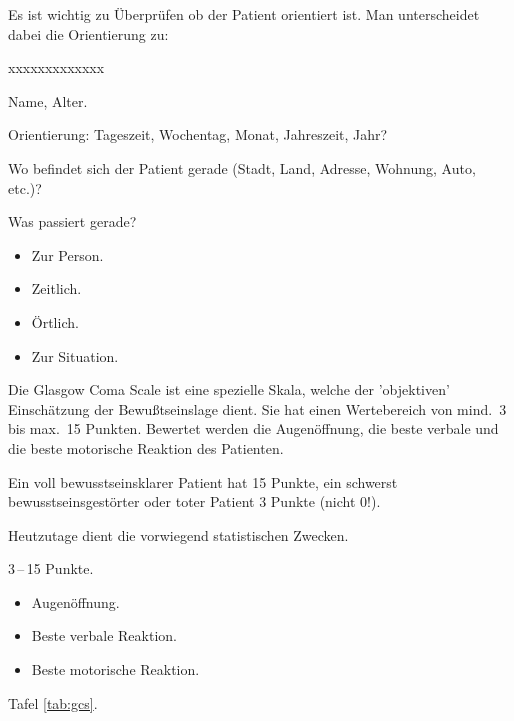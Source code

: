 {

Es ist wichtig zu Überprüfen ob der Patient orientiert ist.
Man unterscheidet dabei die Orientierung zu:  

\begin{labeling}[~--]{xxxxxxxxxxxxx}
  \item[Person] Name, Alter.
  \item[Zeit] Orientierung: Tageszeit,
  Wochentag, Monat, Jahreszeit, Jahr?
  \item[Ort] Wo befindet sich der Patient gerade (Stadt, Land, Adresse, Wohnung, Auto, etc.)?
  \item[Situation] Was passiert gerade?
\end{labeling}

}{
\begin{itemize}
    \item Zur Person. 
    \item Zeitlich. 
    \item Örtlich. 
    \item Zur Situation. 
\end{itemize}
}{}{}{}

{
\label{topic:gcs}

Die Glasgow Coma Scale ist eine spezielle Skala, welche der 'objektiven'
Einschätzung der Bewußtseinslage  dient. Sie hat einen Wertebereich von mind.~3
bis max.~15 Punkten. Bewertet werden die Augenöffnung, die beste verbale und
die beste motorische Reaktion des Patienten. 

Ein voll bewusstseinsklarer Patient hat 15 Punkte, ein schwerst
bewusstseinsgestörter oder toter Patient 3 Punkte (nicht 0!).

Heutzutage dient die  vorwiegend statistischen
Zwecken.
}{
3\,--\,15 Punkte.
\begin{itemize}
    \item Augenöffnung.
    \item Beste verbale Reaktion.
    \item Beste motorische Reaktion.
\end{itemize}
Tafel \ref{tab:gcs}.
}{}{}{}


